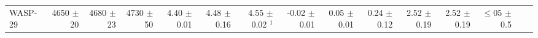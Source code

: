 \begin{sidewaystable*}[t!]
{\begin{tabular}{l r r r r r r r r r r r r r r}

WASP-29  
&  4650  $\pm$ 20 
& 4680  $\pm$ 23 
&  4730 $\pm$ 50 
&   4.40  $\pm$ 0.01  
& 4.48  $\pm$ 0.16 
&  4.55  $\pm$ 0.02 $^1$
&  -0.02  $\pm$ 0.01 
& 0.05  $\pm$ 0.01 
&  0.24   $\pm$ 0.12
& 2.52  $\pm$ 0.19 
& 2.52  $\pm$ 0.19 
&  $\leq 05$   $\pm$ 0.5  \\





\end{tabular}}
\end{sidewaystable*}
